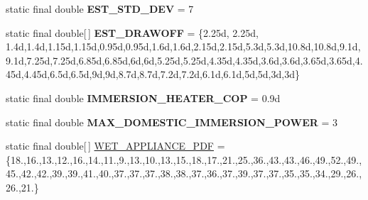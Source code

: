 \begin{DoxyCompactItemize}
\item 
\hypertarget{classuk_1_1ac_1_1dmu_1_1iesd_1_1cascade_1_1base_1_1_consts_aba2afd83ca39c6d69efef1e1804cb985}{static final double {\bfseries E\-S\-T\-\_\-\-S\-T\-D\-\_\-\-D\-E\-V} = 7}\label{classuk_1_1ac_1_1dmu_1_1iesd_1_1cascade_1_1base_1_1_consts_aba2afd83ca39c6d69efef1e1804cb985}

\item 
\hypertarget{classuk_1_1ac_1_1dmu_1_1iesd_1_1cascade_1_1base_1_1_consts_acc961407da88074b7745cda408e689f9}{static final double\mbox{[}$\,$\mbox{]} {\bfseries E\-S\-T\-\_\-\-D\-R\-A\-W\-O\-F\-F} = \{2.\-25d, 2.\-25d, 1.\-4d,1.\-4d,1.\-15d,1.\-15d,0.\-95d,0.\-95d,1.\-6d,1.\-6d,2.\-15d,2.\-15d,5.\-3d,5.\-3d,10.\-8d,10.\-8d,9.\-1d,9.\-1d,7.\-25d,7.\-25d,6.\-85d,6.\-85d,6d,6d,5.\-25d,5.\-25d,4.\-35d,4.\-35d,3.\-6d,3.\-6d,3.\-65d,3.\-65d,4.\-45d,4.\-45d,6.\-5d,6.\-5d,9d,9d,8.\-7d,8.\-7d,7.\-2d,7.\-2d,6.\-1d,6.\-1d,5d,5d,3d,3d\}}\label{classuk_1_1ac_1_1dmu_1_1iesd_1_1cascade_1_1base_1_1_consts_acc961407da88074b7745cda408e689f9}

\item 
\hypertarget{classuk_1_1ac_1_1dmu_1_1iesd_1_1cascade_1_1base_1_1_consts_a2a1bcb6c8f5be010e18c5256d06c2f47}{static final double {\bfseries I\-M\-M\-E\-R\-S\-I\-O\-N\-\_\-\-H\-E\-A\-T\-E\-R\-\_\-\-C\-O\-P} = 0.\-9d}\label{classuk_1_1ac_1_1dmu_1_1iesd_1_1cascade_1_1base_1_1_consts_a2a1bcb6c8f5be010e18c5256d06c2f47}

\item 
\hypertarget{classuk_1_1ac_1_1dmu_1_1iesd_1_1cascade_1_1base_1_1_consts_a7679e8d9b837e6e32fb71f2eac92ff11}{static final double {\bfseries M\-A\-X\-\_\-\-D\-O\-M\-E\-S\-T\-I\-C\-\_\-\-I\-M\-M\-E\-R\-S\-I\-O\-N\-\_\-\-P\-O\-W\-E\-R} = 3}\label{classuk_1_1ac_1_1dmu_1_1iesd_1_1cascade_1_1base_1_1_consts_a7679e8d9b837e6e32fb71f2eac92ff11}

\item 
\hypertarget{classuk_1_1ac_1_1dmu_1_1iesd_1_1cascade_1_1base_1_1_consts_a549eb4bc31d3122fd025557572bdf273}{static final double\mbox{[}$\,$\mbox{]} \hyperlink{classuk_1_1ac_1_1dmu_1_1iesd_1_1cascade_1_1base_1_1_consts_a549eb4bc31d3122fd025557572bdf273}{W\-E\-T\-\_\-\-A\-P\-P\-L\-I\-A\-N\-C\-E\-\_\-\-P\-D\-F} = \{18.,16.,13.,12.,16.,14.,11.,9.,13.,10.,13.,15.,18.,17.,21.,25.,36.,43.,43.,46.,49.,52.,49.,45.,42.,42.,39.,39.,41.,40.,37.,37.,37.,38.,38.,37.,36.,37.,39.,37.,37.,35.,35.,34.,29.,26.,26.,21.\}}\label{classuk_1_1ac_1_1dmu_1_1iesd_1_1cascade_1_1base_1_1_consts_a549eb4bc31d3122fd025557572bdf273}


\end{DoxyCompactItemize}
